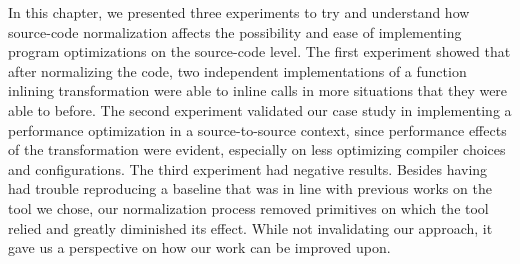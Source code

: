 In this chapter, we presented three experiments to try and understand how source-code normalization affects the possibility and ease of implementing program optimizations on the source-code level. The first experiment showed that after normalizing the code, two independent implementations of a function inlining transformation were able to inline calls in more situations that they were able to before. The second experiment validated our case study in implementing a performance optimization in a source-to-source context, since performance effects of the transformation were evident, especially on less optimizing compiler choices and configurations. The third experiment had negative results. Besides having had trouble reproducing a baseline that was in line with previous works on the tool we chose, our normalization process removed primitives on which the tool relied and greatly diminished its effect. While not invalidating our approach, it gave us a perspective on how our work can be improved upon.
